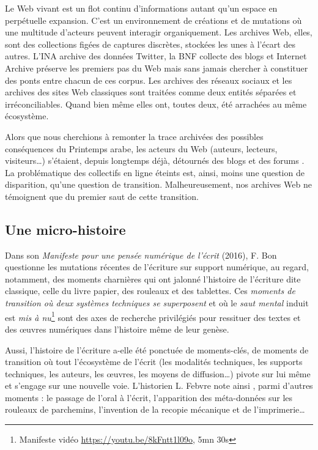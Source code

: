 \documentclass[symmetric,justified,marginals=raggedouter]{tufte-book}
\begin{document}
Le Web vivant est un flot continu d'informations autant qu'un espace en perpétuelle expansion. C'est un environnement de créations et de mutations où une multitude d'acteurs peuvent interagir organiquement. Les archives Web, elles, sont des collections figées de captures discrètes, stockées les unes à l'écart des autres. L'INA archive des données Twitter, la BNF collecte des blogs et Internet Archive préserve les premiers pas du Web mais sans jamais chercher à constituer des ponts entre chacun de ces corpus. Les archives des réseaux sociaux et les archives des sites Web classiques sont traitées comme deux entités séparées et irréconciliables. Quand bien même elles ont, toutes deux, été arrachées au même écosystème. 

Alors que nous cherchions à remonter la trace archivées des possibles conséquences du Printemps arabe, les acteurs du Web (auteurs, lecteurs, visiteurs\ldots{}) s'étaient, depuis longtemps déjà, détournés des blogs et des forums \citep{khondker_role_2011,lotan_arab_2011}. La problématique des collectifs en ligne éteints est, ainsi, moins une question de disparition, qu'une question de transition. Malheureusement, nos archives Web ne témoignent que du premier saut de cette transition.  

\newpage

\subsection{Une micro-histoire}

\noindent Dans son \textit{Manifeste pour une pensée numérique de l'écrit} (2016), F. Bon questionne les mutations récentes de l'écriture sur support numérique, au regard, notamment, des moments charnières qui ont jalonné l'histoire de l'écriture dite classique, celle du livre papier, des rouleaux et des tablettes. Ces \og\textit{moments de transition où deux systèmes techniques se superposent}\fg{} et où le \og\textit{saut mental}\fg{} induit est \og\textit{mis à nu}\fg{}\footnote{\RaggedOuter Manifeste vidéo \url{https://youtu.be/8kFntt1l09o}, 5mn 30s} sont des axes de recherche privilégiés pour ressituer des textes et des œuvres numé\-riques dans l'histoire même de leur genèse. 

Aussi, l'histoire de l'écriture a-elle été ponctuée de moments-clés, de moments de transition où tout l'écosystème de l'écrit (les modalités techniques, les supports techniques, les auteurs, les œuvres, les moyens de diffusion\ldots{}) pivote sur lui même et s'engage sur une nouvelle voie. L'historien L. Febvre note ainsi \citep{febvre_apparition_2013}, parmi d'autres moments : le passage de l'oral à l'écrit, l'apparition des méta-données sur les rouleaux de parchemins, l'invention de la recopie mécanique et de l'imprimerie\ldots{} \\
\end{document}
